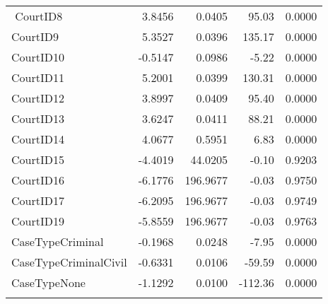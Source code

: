 \documentclass[10pt, letterpaper]{article}
\begin{document}
\begin{spacing}{1.0}
\begin{longtable}{lrrrr}
$$        CourtID8 & 3.8456 & 0.0405 & 95.03 & 0.0000 \\ 
        CourtID9 & 5.3527 & 0.0396 & 135.17 & 0.0000 \\ 
        CourtID10 & -0.5147 & 0.0986 & -5.22 & 0.0000 \\ 
        CourtID11 & 5.2001 & 0.0399 & 130.31 & 0.0000 \\ 
        CourtID12 & 3.8997 & 0.0409 & 95.40 & 0.0000 \\ 
        CourtID13 & 3.6247 & 0.0411 & 88.21 & 0.0000 \\ 
        CourtID14 & 4.0677 & 0.5951 & 6.83 & 0.0000 \\ 
        CourtID15 & -4.4019 & 44.0205 & -0.10 & 0.9203 \\ 
        CourtID16 & -6.1776 & 196.9677 & -0.03 & 0.9750 \\ 
        CourtID17 & -6.2095 & 196.9677 & -0.03 & 0.9749 \\ 
        CourtID19 & -5.8559 & 196.9677 & -0.03 & 0.9763 \\ 
        CaseTypeCriminal & -0.1968 & 0.0248 & -7.95 & 0.0000 \\ 
        CaseTypeCriminalCivil & -0.6331 & 0.0106 & -59.59 & 0.0000 \\ 
        CaseTypeNone & -1.1292 & 0.0100 & -112.36 & 0.0000 \\[6pt]
        \hline
    \label{tb:PerCuriamLR}
\end{longtable}

\end{spacing}
\end{document}
